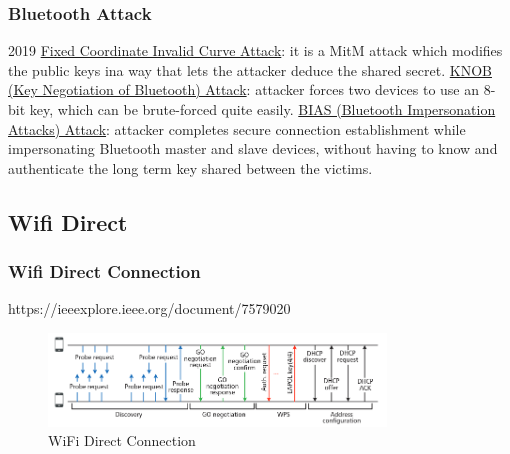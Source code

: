 \documentclass{ctexbeamer}
\begin{document}
\begin{frame}
\frametitle{Bluetooth Attack}

2019 \href{https://eprint.iacr.org/2019/1043.pdf}{Fixed Coordinate Invalid Curve Attack}: it is a MitM attack which modifies the public keys ina way that lets the attacker deduce the shared secret.
\newline
{} \href{https://knobattack.com/}{KNOB (Key Negotiation of Bluetooth) Attack}: attacker forces two devices to use an 8-bit key, which can be brute-forced quite easily. 
\newline
{} \href{https://francozappa.github.io/about-bias/}{BIAS (Bluetooth Impersonation Attacks) Attack}: attacker completes secure connection establishment while impersonating Bluetooth master and slave devices, without having to know and authenticate the long term key shared between the victims.

\end{frame}

\subsection{Wifi Direct}
\begin{frame}
\frametitle{Wifi Direct Connection}

https://ieeexplore.ieee.org/document/7579020

    \begin{figure}[H]
        \centering 
        \includegraphics[width=0.8\textwidth]{pic/wifi-direct.png} 
        \caption{WiFi Direct Connection}
        \label{fig.wifi.direct}
    \end{figure}

\end{frame}
\end{document}
